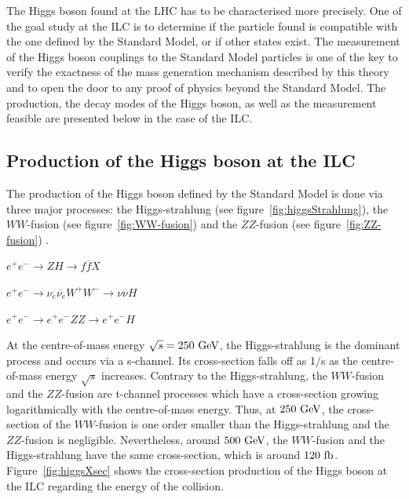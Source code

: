   The Higgs boson found at the \gls{LHC} has to be characterised more precisely.
  One of the goal study at the \gls{ILC} is to determine if the particle found is compatible with the one defined by the Standard Model, or if other states exist.
  The measurement of the Higgs boson couplings to the Standard Model particles is one of the key to verify the exactness of the mass generation mechanism described by this theory and to open the door to any proof of physics beyond the Standard Model.
  The production, the decay modes of the Higgs boson, as well as the measurement feasible are presented below in the case of the \gls{ILC}.

    \subsection{Production of the Higgs boson at the ILC}

    The production of the Higgs boson defined by the Standard Model is done via three major processes: the Higgs-strahlung (see figure~\ref{fig:higgsStrahlung}), the $WW$-fusion (see figure~\ref{fig:WW-fusion}) and the $ZZ$-fusion (see figure~\ref{fig:ZZ-fusion}) \cite{Asner2013}.

    \begin{description}
      \centering
      \item[Higgs-strahlung:] $e^+e^- \rightarrow ZH \rightarrow f\overline{f}X$
      \item[$WW$-fusion:] $e^+e^- \rightarrow \nu_{e} \overline{\nu_{e}} W^+W^- \rightarrow \nu \overline{\nu} H$
      \item[$ZZ$-fusion:] $e^+e^- \rightarrow e^+e^- ZZ \rightarrow e^+e^- H$
    \end{description}

    At the centre-of-mass energy $\sqrt{s} = 250~\rm{GeV}$, the Higgs-strahlung is the dominant process and occurs via a s-channel. 
    Its cross-section falls off as 1/s as the centre-of-mass energy $\sqrt{s}$ increases.
    Contrary to the Higgs-strahlung, the $WW$-fusion and the $ZZ$-fusion are t-channel processes which have a cross-section growing logarithmically with the centre-of-mass energy.
    Thus, at $250~\rm{GeV}$, the cross-section of the $WW$-fusion is one order smaller than the Higgs-strahlung and the $ZZ$-fusion is negligible.
    Nevertheless, around $500~\rm{GeV}$, the $WW$-fusion and the Higgs-strahlung have the same cross-section, which is around $120~\rm{fb}$.
    Figure~\ref{fig:higgsXsec} shows the cross-section production of the Higgs boson at the \gls{ILC} regarding the energy of the collision.
    
